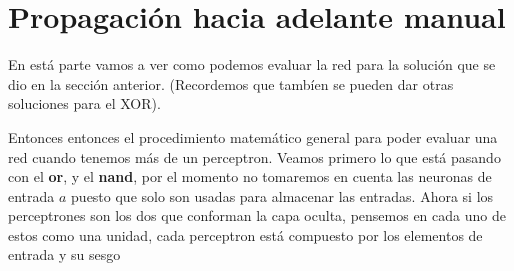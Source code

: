\section{Propagación hacia adelante manual}

En está parte vamos a ver como podemos evaluar la red para la solución que se dio en la sección anterior. (Recordemos que tambíen se pueden dar otras soluciones para el XOR).

Entonces entonces el procedimiento matemático general para poder evaluar una red cuando tenemos más de un perceptron. Veamos primero lo que está pasando con el \textbf{or}, y el \textbf{nand}, por el momento no tomaremos en cuenta las neuronas de entrada $a$ puesto que solo son usadas para almacenar las entradas. Ahora si
los perceptrones son los dos que conforman la capa oculta, pensemos en cada uno de estos como una unidad, cada perceptron está compuesto por los elementos de entrada y su sesgo  

